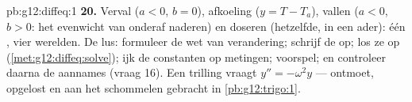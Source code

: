 \begin{solution}{pb:g12:diffeq:1}
\textbf{20.} Verval ($a < 0$, $b = 0$), afkoeling ($y = T - T_a$), vallen
($a < 0$, $b > 0$: het evenwicht van onderaf naderen) en doseren (hetzelfde,
in een ader): één , vier werelden. De lus: formuleer de wet van
verandering; schrijf de  op; los ze op
(\cref{met:g12:diffeq:solve}); ijk de constanten op metingen; voorspel; en
controleer daarna de aannames (vraag 16). Een trilling vraagt
$y'' = -\omega^2 y$ --- ontmoet, opgelost en aan het schommelen gebracht in
\cref{pb:g12:trigo:1}.
\end{solution}
